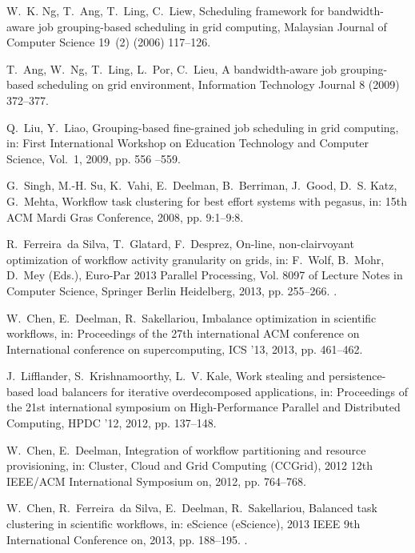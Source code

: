 \documentclass[final,5p,times,twocolumn]{elsarticle}
\begin{document}
\begin{thebibliography}{10}
W.~K. Ng, T.~Ang, T.~Ling, C.~Liew, Scheduling framework for bandwidth-aware
  job grouping-based scheduling in grid computing, Malaysian Journal of
  Computer Science 19~(2) (2006) 117--126.

T.~Ang, W.~Ng, T.~Ling, L.~Por, C.~Lieu, A bandwidth-aware job grouping-based
  scheduling on grid environment, Information Technology Journal 8 (2009)
  372--377.

Q.~Liu, Y.~Liao, Grouping-based fine-grained job scheduling in grid computing,
  in: First International Workshop on Education Technology and Computer
  Science, Vol.~1, 2009, pp. 556 --559.

G.~Singh, M.-H. Su, K.~Vahi, E.~Deelman, B.~Berriman, J.~Good, D.~S. Katz,
  G.~Mehta, Workflow task clustering for best effort systems with pegasus, in:
  15th {ACM} Mardi Gras Conference, 2008, pp. 9:1--9:8.

R.~Ferreira~da Silva, T.~Glatard, F.~Desprez, On-line, non-clairvoyant
  optimization of workflow activity granularity on grids, in: F.~Wolf, B.~Mohr,
  D.~Mey (Eds.), Euro-Par 2013 Parallel Processing, Vol. 8097 of Lecture Notes
  in Computer Science, Springer Berlin Heidelberg, 2013, pp. 255--266.
\newblock \href {http://dx.doi.org/10.1007/978-3-642-40047-6_28}
  {}.

W.~Chen, E.~Deelman, R.~Sakellariou, Imbalance optimization in scientific
  workflows, in: Proceedings of the 27th international ACM conference on
  International conference on supercomputing, ICS '13, 2013, pp. 461--462.

J.~Lifflander, S.~Krishnamoorthy, L.~V. Kale, Work stealing and
  persistence-based load balancers for iterative overdecomposed applications,
  in: Proceedings of the 21st international symposium on High-Performance
  Parallel and Distributed Computing, HPDC '12, 2012, pp. 137--148.

W.~Chen, E.~Deelman, Integration of workflow partitioning and resource
  provisioning, in: Cluster, Cloud and Grid Computing (CCGrid), 2012 12th
  IEEE/ACM International Symposium on, 2012, pp. 764--768.

W.~Chen, R.~Ferreira~da Silva, E.~Deelman, R.~Sakellariou, Balanced task
  clustering in scientific workflows, in: eScience (eScience), 2013 IEEE 9th
  International Conference on, 2013, pp. 188--195.
\newblock \href {http://dx.doi.org/10.1109/eScience.2013.40}
  {}.


\end{thebibliography}
\end{document}
